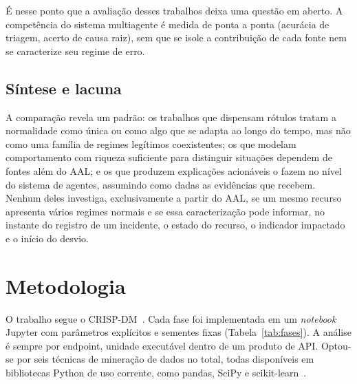 \documentclass[sigconf,nonacm]{acmart}
\begin{document}
É nesse ponto que a avaliação desses trabalhos deixa uma questão em aberto. A competência do sistema multiagente é medida de ponta a ponta (acurácia de triagem, acerto de causa raiz), sem que se isole a contribuição de cada fonte nem se caracterize seu regime de erro.

\subsection{Síntese e lacuna}
A comparação revela um padrão: os trabalhos que dispensam rótulos tratam a normalidade como única ou como algo que se adapta ao longo do tempo, mas não como uma família de regimes legítimos coexistentes; os que modelam comportamento com riqueza suficiente para distinguir situações dependem de fontes além do AAL; e os que produzem explicações acionáveis o fazem no nível do sistema de agentes, assumindo como dadas as evidências que recebem. Nenhum deles investiga, exclusivamente a partir do AAL, se um mesmo recurso apresenta vários regimes normais e se essa caracterização pode informar, no instante do registro de um incidente, o estado do recurso, o indicador impactado e o início do desvio.

\section{Metodologia}\label{sec:metodologia}

O trabalho segue o CRISP-DM~\citep{wirth2000crispdm,chapman2000crispdm}. Cada fase foi implementada em um \emph{notebook} Jupyter com parâmetros explícitos e sementes fixas (Tabela~\ref{tab:fases}). A análise é sempre por endpoint, unidade executável dentro de um produto de API. Optou-se por seis técnicas de mineração de dados no total, todas disponíveis em bibliotecas Python de uso corrente, como pandas, SciPy e scikit-learn~\citep{pedregosa2011sklearn}.
\end{document}
